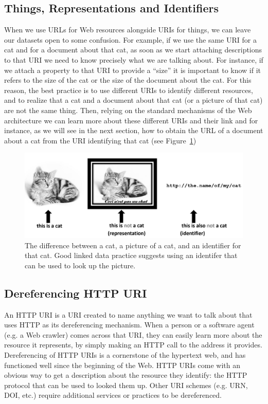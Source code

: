 \subsection{Things, Representations and Identifiers}
\label{usehttp}
When we use URLs for Web resources alongside URIs for things, we can
leave our datasets open to some confusion. For example, if we use the
same URI for a cat and for a document about that cat, as soon as we
start attaching descriptions to that URI we need to know precisely what
we are talking about. For instance, if we attach a property to that URI
to provide a ``size'' it is important to know if it refers to the size of the
cat or the size of the document about the cat. For this reason, the best
practice is to use different URIs to identify different resources, and
to realize that a cat and a document about that cat (or a picture of
that cat) are not the same thing. Then, relying on the standard
mechanisms of the Web architecture we can learn more about these
different URIs and their link and for instance, as we will see in the
next section, how to obtain the URL of a document about a cat from the
URI identifying that cat (see Figure~\ref{fig:ch5.cats})

\begin{figure}
    \centering
    \includegraphics[width=5in]{media/ch5/WebAndCats.jpg}
    \caption{The difference between a cat, a picture of a cat, and an identifier for that cat.  Good linked data practice suggests using an identifer that can be used to look up the picture. }
    \label{fig:ch5.cats}
\end{figure}

\hypertarget{dereferencing-http-uri}{%
\subsection{Dereferencing HTTP URI }\label{dereferencing-http-uri}}

An HTTP URI is a URI created to name anything we want to talk about 
that  uses  HTTP   as its dereferencing mechanism. When a person or a
software agent (e.g. a Web crawler) comes across that URI, they can easily learn more
about the resource it represents,  by simply making an HTTP call
to the address it provides.   Dereferencing of HTTP URIs is a cornerstone of the hypertext web, and has
functioned well since the beginning of the Web. HTTP URIs come with an
obvious way to get a description about the resource they identify: the
HTTP protocol that can be used to looked them up. Other URI schemes
(e.g. URN, DOI, etc.) require additional services or practices to be
dereferenced.  

